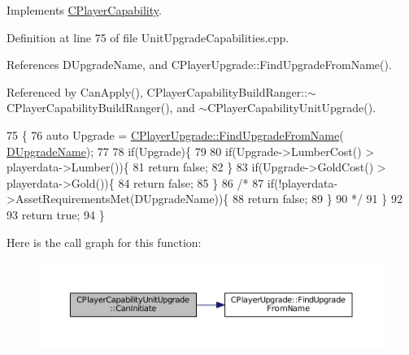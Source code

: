Implements \hyperlink{classCPlayerCapability_aa83b1e1fcaff2985c378132d679154ea}{C\+Player\+Capability}.



Definition at line 75 of file Unit\+Upgrade\+Capabilities.\+cpp.



References D\+Upgrade\+Name, and C\+Player\+Upgrade\+::\+Find\+Upgrade\+From\+Name().



Referenced by Can\+Apply(), C\+Player\+Capability\+Build\+Ranger\+::$\sim$\+C\+Player\+Capability\+Build\+Ranger(), and $\sim$\+C\+Player\+Capability\+Unit\+Upgrade().


\begin{DoxyCode}
75                                                                                                            
                     \{
76     \textcolor{keyword}{auto} Upgrade = \hyperlink{classCPlayerUpgrade_af47a08aba3a1a5b2cefacef24065a82e}{CPlayerUpgrade::FindUpgradeFromName}(
      \hyperlink{classCPlayerCapabilityUnitUpgrade_a5de8bffd6935c699f431329ad4ee5eec}{DUpgradeName});
77     
78     \textcolor{keywordflow}{if}(Upgrade)\{
79 
80         \textcolor{keywordflow}{if}(Upgrade->LumberCost() > playerdata->Lumber())\{
81             \textcolor{keywordflow}{return} \textcolor{keyword}{false};   
82         \}
83         \textcolor{keywordflow}{if}(Upgrade->GoldCost() > playerdata->Gold())\{
84             \textcolor{keywordflow}{return} \textcolor{keyword}{false};   
85         \}
86         \textcolor{comment}{/*}
87 \textcolor{comment}{        if(!playerdata->AssetRequirementsMet(DUpgradeName))\{}
88 \textcolor{comment}{            return false;}
89 \textcolor{comment}{        \}}
90 \textcolor{comment}{        */}
91     \}
92     
93     \textcolor{keywordflow}{return} \textcolor{keyword}{true};
94 \}
\end{DoxyCode}
Here is the call graph for this function\+:\nopagebreak
\begin{figure}[H]
\begin{center}
\leavevmode
\includegraphics[width=350pt]{classCPlayerCapabilityUnitUpgrade_ad01fc5df598efea4063ac2bbf0ba34e9_cgraph}
\end{center}
\end{figure}
